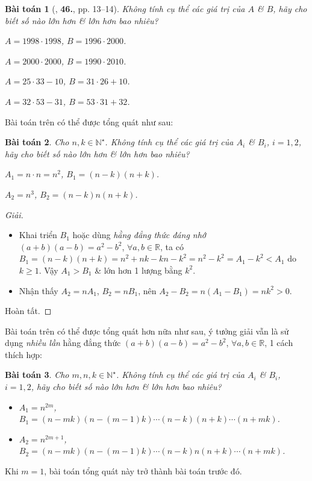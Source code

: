 \documentclass{article}
\numberwithin{equation}{section}
\newtheorem{baitoan}{Bài toán}[section]
\begin{document}
\begin{baitoan}[\cite{Binh_Toan_6_tap_1}, \textbf{46.}, pp. 13--14]
	Không tính cụ thể các giá trị của $A$ \& $B$, hãy cho biết số nào lớn hơn \& lớn hơn bao nhiêu?
	\begin{enumerate*}
		\item[(a)] $A = 1998\cdot 1998$, $B = 1996\cdot 2000$.
		\item[(b)] $A = 2000\cdot 2000$, $B = 1990\cdot 2010$.
		\item[(c)] $A = 25\cdot 33 - 10$, $B = 31\cdot 26 + 10$.
		\item[(d)] $A = 32\cdot 53 - 31$, $B = 53\cdot 31 + 32$.
	\end{enumerate*}
\end{baitoan}
Bài toán trên có thể được tổng quát như sau:

\begin{baitoan}
	Cho $n,k\in\mathbb{N}^\star$. Không tính cụ thể các giá trị của $A_i$ \& $B_i$, $i = 1,2$, hãy cho biết số nào lớn hơn \& lớn hơn bao nhiêu?
	\begin{enumerate*}
		\item[(a)] $A_1 = n\cdot n = n^2$, $B_1 = (n - k)(n + k)$.
		\item[(b)] $A_2 = n^3$, $B_2 = (n - k)n(n + k)$.
	\end{enumerate*}	
\end{baitoan}

\begin{proof}[Giải]
	\begin{itemize}
		\item[(a)] Khai triển $B_1$ hoặc dùng \textit{hằng đẳng thức đáng nhớ} $(a + b)(a - b) = a^2 - b^2$, $\forall a,b\in\mathbb{R}$, ta có $B_1 = (n - k)(n + k) = n^2 + nk - kn - k^2 = n^2 - k^2 = A_1 - k^2 < A_1$ do $k\ge 1$. Vậy $A_1 > B_1$ \& lớn hơn 1 lượng bằng $k^2$.
		\item[(b)] Nhận thấy $A_2 = nA_1$, $B_2 = nB_1$, nên $A_2 - B_2 = n(A_1 - B_1) = nk^2 > 0$.
	\end{itemize}
	Hoàn tất.
\end{proof}
Bài toán trên có thể được tổng quát hơn nữa như sau, ý tưởng giải vẫn là sử dụng \textit{nhiều lần} hằng đẳng thức $(a + b)(a - b) = a^2 - b^2$, $\forall a,b\in\mathbb{R}$, 1 cách thích hợp:

\begin{baitoan}
	Cho $m,n,k\in\mathbb{N}^\star$. Không tính cụ thể các giá trị của $A_i$ \& $B_i$, $i = 1,2$, hãy cho biết số nào lớn hơn \& lớn hơn bao nhiêu?
	\begin{itemize}
		\item[(a)] $A_1 = n^{2m}$, $B_1 = (n - mk)(n - (m - 1)k)\cdots(n - k)(n + k)\cdots(n + mk)$.
		\item[(b)] $A_2 = n^{2m + 1}$, $B_2 = (n - mk)(n - (m - 1)k)\cdots(n - k)n(n + k)\cdots(n + mk)$.
	\end{itemize}
\end{baitoan}
Khi $m = 1$, bài toán tổng quát này trở thành bài toán trước đó.
\end{document}
